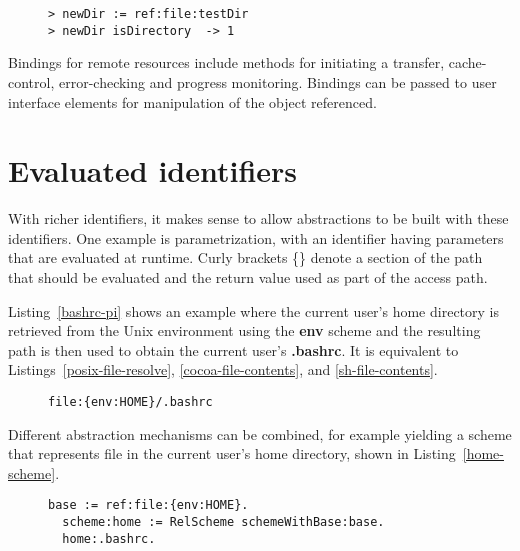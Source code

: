 \documentclass[preprint,authoryear]{acm_proc_article-sp}
\begin{document}
\begin{figure}[htbp]
\begin{lstlisting}[style=L,label=ref-file-dir,caption=File and directory manipulation.]
> newDir := ref:file:testDir 
> newDir isDirectory  -> 1
\end{lstlisting}
\end{figure}

Bindings for remote resources include methods for initiating a transfer, cache-control,
error-checking and progress monitoring.   Bindings can be passed to user interface
elements for manipulation of the object referenced.




\section{Evaluated identifiers}

With richer identifiers, it makes sense to allow abstractions to be built with these identifiers.
One example is parametrization, with an identifier having parameters that are evaluated
at runtime.  Curly brackets \{\} denote a section of the path that should be evaluated and
the return value used as part of the access path.

Listing~\ref{bashrc-pi} shows an example where the current user's home directory
is retrieved from the Unix environment using the {\bf env} scheme and the resulting
path is then used to obtain the current user's  {\bf .bashrc}.
It is equivalent to Listings~\ref{posix-file-resolve}, \ref{cocoa-file-contents}, and 
\ref{sh-file-contents}.

\begin{figure}[htbp]
\begin{lstlisting}[style=L,label=bashrc-pi,caption=Parametrized identifier.]
  file:{env:HOME}/.bashrc
\end{lstlisting}
\end{figure}


Different abstraction mechanisms can be combined, for example yielding
a scheme that represents file in the current user's home directory, shown
in Listing~\ref{home-scheme}.


\begin{figure}[htbp]
\begin{lstlisting}[style=L,label=home-scheme,caption=Accessing .bashrc via custom home: scheme.]
  base := ref:file:{env:HOME}.
  scheme:home := RelScheme schemeWithBase:base.
  home:.bashrc.
\end{lstlisting}
\end{figure}
\end{document}
